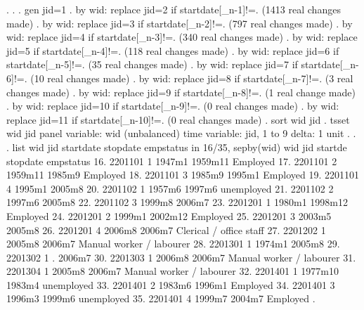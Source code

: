 . 
. 
. gen jid=1
{\smallskip}
. by wid: replace jid=2 if startdate[_n-1]!=.
(1413 real changes made)
{\smallskip}
. by wid: replace jid=3 if startdate[_n-2]!=.
(797 real changes made)
{\smallskip}
. by wid: replace jid=4 if startdate[_n-3]!=.
(340 real changes made)
{\smallskip}
. by wid: replace jid=5 if startdate[_n-4]!=.
(118 real changes made)
{\smallskip}
. by wid: replace jid=6 if startdate[_n-5]!=.
(35 real changes made)
{\smallskip}
. by wid: replace jid=7 if startdate[_n-6]!=.
(10 real changes made)
{\smallskip}
. by wid: replace jid=8 if startdate[_n-7]!=.
(3 real changes made)
{\smallskip}
. by wid: replace jid=9 if startdate[_n-8]!=.
(1 real change made)
{\smallskip}
. by wid: replace jid=10 if startdate[_n-9]!=.
(0 real changes made)
{\smallskip}
. by wid: replace jid=11 if startdate[_n-10]!=.
(0 real changes made)
{\smallskip}
. sort wid jid
{\smallskip}
. tsset wid jid
       panel variable:  wid (unbalanced)
        time variable:  jid, 1 to 9
                delta:  1 unit
{\smallskip}
. 
. 
. list wid jid startdate stopdate empstatus in 16/35, sepby(wid)
{\smallskip}
     {\TLC}
     {\VBAR}     wid   jid   startd{\tytilde}e   stopdate                  empstatus {\VBAR}
     {\LFTT}
 16. {\VBAR} 2201101     1     1947m1    1959m11                   Employed {\VBAR}
 17. {\VBAR} 2201101     2    1959m11     1985m9                   Employed {\VBAR}
 18. {\VBAR} 2201101     3     1985m9     1995m1                   Employed {\VBAR}
 19. {\VBAR} 2201101     4     1995m1     2005m8                            {\VBAR}
     {\LFTT}
 20. {\VBAR} 2201102     1     1957m6     1997m6                 unemployed {\VBAR}
 21. {\VBAR} 2201102     2     1997m6     2005m8                            {\VBAR}
 22. {\VBAR} 2201102     3     1999m8     2006m7                            {\VBAR}
     {\LFTT}
 23. {\VBAR} 2201201     1     1980m1    1998m12                   Employed {\VBAR}
 24. {\VBAR} 2201201     2     1999m1    2002m12                   Employed {\VBAR}
 25. {\VBAR} 2201201     3     2003m5     2005m8                            {\VBAR}
 26. {\VBAR} 2201201     4     2006m8     2006m7    Clerical / office staff {\VBAR}
     {\LFTT}
 27. {\VBAR} 2201202     1     2005m8     2006m7   Manual worker / labourer {\VBAR}
     {\LFTT}
 28. {\VBAR} 2201301     1     1974m1     2005m8                            {\VBAR}
     {\LFTT}
 29. {\VBAR} 2201302     1          .     2006m7                            {\VBAR}
     {\LFTT}
 30. {\VBAR} 2201303     1     2006m8     2006m7   Manual worker / labourer {\VBAR}
     {\LFTT}
 31. {\VBAR} 2201304     1     2005m8     2006m7   Manual worker / labourer {\VBAR}
     {\LFTT}
 32. {\VBAR} 2201401     1    1977m10     1983m4                 unemployed {\VBAR}
 33. {\VBAR} 2201401     2     1983m6     1996m1                   Employed {\VBAR}
 34. {\VBAR} 2201401     3     1996m3     1999m6                 unemployed {\VBAR}
 35. {\VBAR} 2201401     4     1999m7     2004m7                   Employed {\VBAR}
     {\BLC}
{\smallskip}
. 
